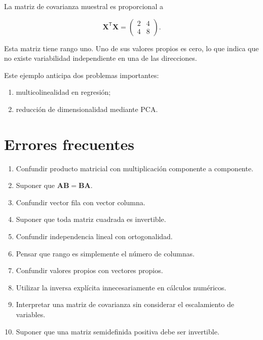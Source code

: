\documentclass[
  spanish,
  10.5pt,
  letterpaper,
  DIV=11,
  numbers=noendperiod,
  oneside,
  open=any]{scrreprt}
\providecommand{\tightlist}{%
  \setlength{\itemsep}{0pt}\setlength{\parskip}{0pt}}
\theoremstyle{definition}
\theoremstyle{definition}
\theoremstyle{plain}
\theoremstyle{remark}
\begin{document}
La matriz de covarianza muestral es proporcional a

\[
\mathbf{X}^{\mathsf T}\mathbf{X}
=
\begin{pmatrix}
2 & 4\\
4 & 8
\end{pmatrix}.
\]

Esta matriz tiene rango uno. Uno de sus valores propios es cero, lo que
indica que no existe variabilidad independiente en una de las
direcciones.

Este ejemplo anticipa dos problemas importantes:

\begin{enumerate}
\def\labelenumi{\arabic{enumi}.}
\tightlist
\item
  multicolinealidad en regresión;
\item
  reducción de dimensionalidad mediante PCA.
\end{enumerate}

\section*{Errores frecuentes}\label{errores-frecuentes-1}


\begin{enumerate}
\def\labelenumi{\arabic{enumi}.}
\tightlist
\item
  Confundir producto matricial con multiplicación componente a
  componente.
\item
  Suponer que \(\mathbf{A}\mathbf{B}=\mathbf{B}\mathbf{A}\).
\item
  Confundir vector fila con vector columna.
\item
  Suponer que toda matriz cuadrada es invertible.
\item
  Confundir independencia lineal con ortogonalidad.
\item
  Pensar que rango es simplemente el número de columnas.
\item
  Confundir valores propios con vectores propios.
\item
  Utilizar la inversa explícita innecesariamente en cálculos numéricos.
\item
  Interpretar una matriz de covarianza sin considerar el escalamiento de
  variables.
\item
  Suponer que una matriz semidefinida positiva debe ser invertible.
\end{enumerate}
\end{document}
